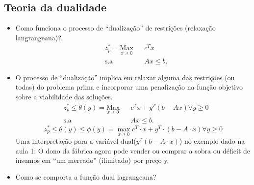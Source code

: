 \subsection{Teoria da dualidade}
\begin{enumerate}
\begin{itemize}
\item Como funciona o processo de “dualização” de restrições (relaxação langrangeana)?
\begin{equation*}
\begin{aligned}
& z_{p}^{*}=\underset{x\geq0}{\text{Max}}
& & c^{T}x \\
& \text{s.a}
& & Ax \leq b.
\end{aligned}
\end{equation*}
\item O processo de ``dualização'' implica em relaxar alguma das restrições
(ou todas) do problema prima e incorporar uma penalização na função
objetivo sobre a viabilidade das soluções.
\begin{equation*}
\begin{aligned}
& z_{p}^{*}\leq \theta(y)=\underset{x\geq0}{\text{Max}}
& & c^{T}x+y^{T}(b-Ax)  \forall  y\geq 0 \\
& \text{s.a}
& & Ax \leq b.
\end{aligned}
\end{equation*}
\[
z_{p}^{*}\leq\theta(y)\leq\phi(y)=\max_{x\geq0}c^{T}\cdot x+y^{T}\cdot(b-A\cdot x)\forall y\geq0
\]
Uma interpretação para a variável dual($y^{T}(b-A\cdot x)$) no exemplo dado na aula 1: O dono da fábrica agora pode vender ou comprar a sobra ou déficit de insumos em “um mercado” (ilimitado) por preço y.
\item Como se comporta a função dual lagrangeana?


\end{itemize}
\end{enumerate}

